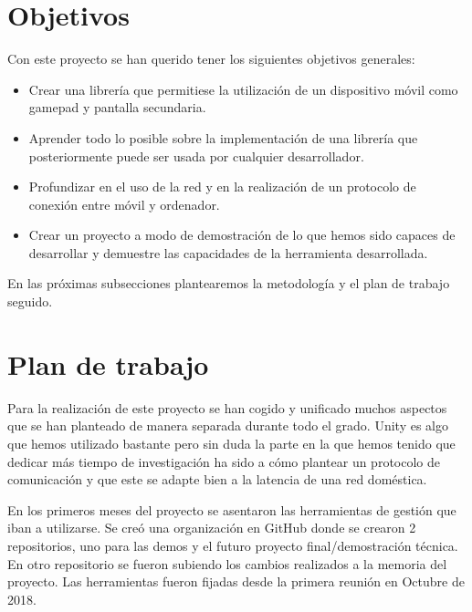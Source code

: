 \section{Objetivos}
\label{cap3:sec:obejtivos}

Con este proyecto se han querido tener los siguientes objetivos generales:

\begin{itemize}
\item Crear una librer\'ia que permitiese la utilizaci\'on de un dispositivo m\'ovil como gamepad y pantalla secundaria.
\item Aprender todo lo posible sobre la implementaci\'on de una librer\'ia que posteriormente puede ser usada por cualquier desarrollador.
\item Profundizar en el uso de la red y en la realizaci\'on de un protocolo de conexi\'on entre m\'ovil y ordenador.
\item Crear un proyecto a modo de demostraci\'on de lo que hemos sido capaces de desarrollar y demuestre las capacidades de la herramienta desarrollada.
\end{itemize}

En las pr\'oximas subsecciones plantearemos la metodolog\'ia y el plan de trabajo seguido.


\section{Plan de trabajo}
\label{cap3:sec:plandetrabajo}

Para la realizaci\'on de este proyecto se han cogido y unificado muchos aspectos que se han planteado de manera separada durante todo el grado. Unity es algo que hemos utilizado bastante pero sin duda la parte en la que hemos tenido que dedicar m\'as tiempo de investigaci\'on ha sido a c\'omo plantear un protocolo de comunicaci\'on y que este se adapte bien a la latencia de una red dom\'estica.

En los primeros meses del proyecto se asentaron las herramientas de gesti\'on que iban a utilizarse. Se cre\'o una organizaci\'on en GitHub donde se crearon 2 repositorios, uno para las demos y el futuro proyecto final/demostraci\'on t\'ecnica. En otro repositorio se fueron subiendo los cambios realizados a la memoria del proyecto.
Las herramientas fueron fijadas desde la primera reuni\'on en Octubre de 2018.

